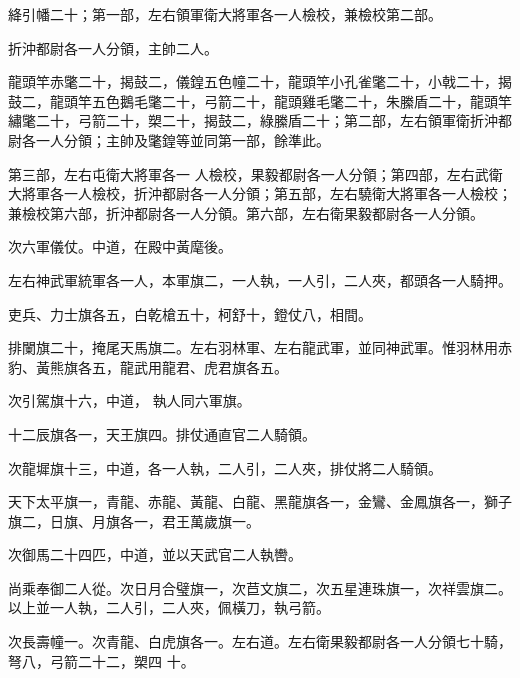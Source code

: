 \begin{pinyinscope}
 絳引幡二十；第一部，左右領軍衛大將軍各一人檢校，兼檢校第二部。



 折沖都尉各一人分領，主帥二人。



 龍頭竿赤氅二十，揭鼓二，儀鍠五色幢二十，龍頭竿小孔雀氅二十，小戟二十，揭鼓二，龍頭竿五色鵝毛氅二十，弓箭二十，龍頭雞毛氅二十，朱縢盾二十，龍頭竿繡氅二十，弓箭二十，槊二十，揭鼓二，綠縢盾二十；第二部，左右領軍衛折沖都尉各一人分領；主帥及氅鍠等並同第一部，餘準此。



 第三部，左右屯衛大將軍各一
 人檢校，果毅都尉各一人分領；第四部，左右武衛大將軍各一人檢校，折沖都尉各一人分領；第五部，左右驍衛大將軍各一人檢校；兼檢校第六部，折沖都尉各一人分領。第六部，左右衛果毅都尉各一人分領。



 次六軍儀仗。中道，在殿中黃麾後。



 左右神武軍統軍各一人，本軍旗二，一人執，一人引，二人夾，都頭各一人騎押。



 吏兵、力士旗各五，白乾槍五十，柯舒十，鐙仗八，相間。



 排闌旗二十，掩尾天馬旗二。左右羽林軍、左右龍武軍，並同神武軍。惟羽林用赤豹、黃熊旗各五，龍武用龍君、虎君旗各五。



 次引駕旗十六，中道，
 執人同六軍旗。



 十二辰旗各一，天王旗四。排仗通直官二人騎領。



 次龍墀旗十三，中道，各一人執，二人引，二人夾，排仗將二人騎領。



 天下太平旗一，青龍、赤龍、黃龍、白龍、黑龍旗各一，金鸞、金鳳旗各一，獅子旗二，日旗、月旗各一，君王萬歲旗一。



 次御馬二十四匹，中道，並以天武官二人執轡。



 尚乘奉御二人從。次日月合璧旗一，次苣文旗二，次五星連珠旗一，次祥雲旗二。以上並一人執，二人引，二人夾，佩橫刀，執弓箭。



 次長壽幢一。次青龍、白虎旗各一。左右道。左右衛果毅都尉各一人分領七十騎，弩八，弓箭二十二，槊四
 十。




\end{pinyinscope}
